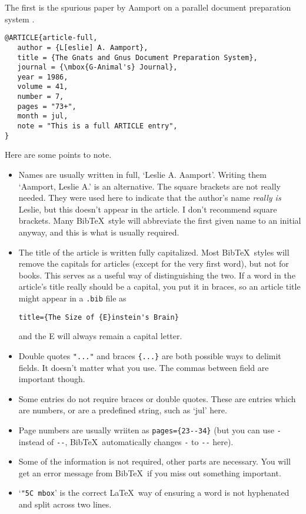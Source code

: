 \documentclass[a4paper]{article}
\newcommand{\fn}[1]{{\tt #1}}
\newcommand{\cn}[1]{{\tt \char"5C #1}}
\newcommand{\BibTeX}{{\sc Bib}\TeX}
\begin{document}
The first is the spurious paper by Aamport 
on a parallel
document preparation system \cite{article-full}.
\begin{verbatim}
@ARTICLE{article-full,
   author = {L[eslie] A. Aamport},
   title = {The Gnats and Gnus Document Preparation System},
   journal = {\mbox{G-Animal's} Journal},
   year = 1986,
   volume = 41,
   number = 7,
   pages = "73+",
   month = jul,
   note = "This is a full ARTICLE entry",
}
\end{verbatim}
Here are some points to note.
\begin{itemize}
\item Names are usually written in full, `Leslie A. Aamport'.
Writing them `Aamport, Leslie A.' is an alternative.  The square
brackets are not really needed.  They were used here to indicate 
that the author's name {\it really is} Leslie, but this doesn't
appear in the article.  I don't recommend square brackets.
Many \BibTeX\ style will abbreviate the first given name to 
an initial anyway, and this is what is usually required.
\item  The title of the article is written fully capitalized.
Most \BibTeX\ styles will remove the capitals for articles (except for the
very first word), but not for books.  This serves as a useful way of 
distinguishing the two.  If a word in the article's title really should 
be a capital, you put it in braces, so an article title might appear
in a \fn{.bib} file as
\begin{verbatim}
title={The Size of {E}instein's Brain}
\end{verbatim}
and the E will always remain a capital letter.
\item Double quotes \verb|"..."| and braces \verb|{...}| are
both possible ways to delimit fields. It doesn't matter what you
use.  The commas between field are important though.
\item Some entries do not require braces or double quotes.  These
are entries which are numbers, or are a predefined string, such as
`jul' here.
\item Page numbers are usually wriiten as \verb|pages={23--34}|
(but you can use \verb|-| instead of \verb|--|, \BibTeX\ automatically
changes \verb|-| to \verb|--| here).
\item Some of the information is not required, other parts are necessary.
You will get an error message from \BibTeX\ if you miss out 
something important.
\item `\cn{mbox}' is the correct \LaTeX\ way of ensuring a word is not 
hyphenated  and split across two lines.
\end{itemize}
\end{document}
